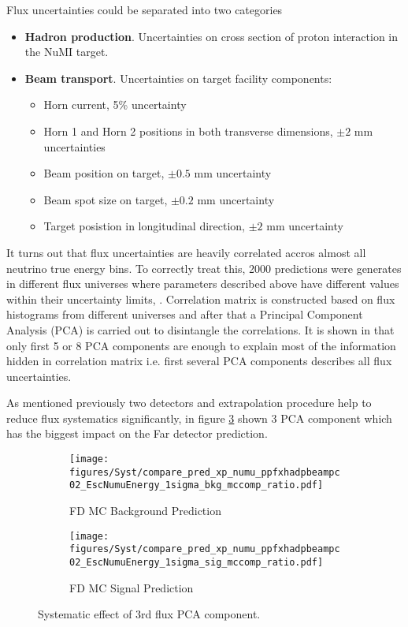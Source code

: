 Flux uncertainties could be separated into two categories 
\begin{itemize}
\item \textbf{Hadron production}. Uncertainties on cross section of proton interaction in the NuMI target. 
\item \textbf{Beam transport}. Uncertainties on target facility components:
\begin{itemize}
	\item Horn current, 5\% uncertainty
	\item Horn 1 and Horn 2 positions in both transverse dimensions,  $\pm2$ mm uncertainties
	\item Beam position on target, $\pm0.5$ mm uncertainty
        \item Beam spot size on target, $\pm0.2$ mm uncertainty
	\item Target posistion in longitudinal direction, $\pm2$ mm uncertainty
\end{itemize} 
\end{itemize}

It turns out that flux uncertainties are heavily correlated accros almost all neutrino true energy bins. To correctly treat this,
2000 predictions were generates in different flux universes where parameters described above have different values within their
uncertainty limits, \cite{fluxPCA_technote}. Correlation matrix is constructed based on flux histograms from different universes 
and after that a Principal Component Analysis (PCA) is carried out to disintangle the correlations. It is shown in 
\cite{fluxPCA_technote} that only first 5 or 8 PCA components are enough to explain most of the information hidden in correlation 
matrix i.e. first several PCA components describes all flux uncertainties. 

As mentioned previously two detectors and extrapolation procedure help to reduce flux systematics significantly, in figure 
\ref{fig:ppfxhadpbeampc02} shown 3 PCA component which has the biggest impact on the Far detector prediction.

\newpage
\begin{figure}[t!]
\begin{subfigure}[t]{0.5\textwidth}
  \centering
  \texttt{[image: figures/Syst/compare\_pred\_xp\_numu\_ppfxhadpbeampc02\_EscNumuEnergy\_1sigma\_bkg\_mccomp\_ratio.pdf]}
  \caption{FD MC Background Prediction}
  \label{fig:bkg_ppfxhadpbeampc02}
\end{subfigure}%
\begin{subfigure}[t]{0.5\textwidth}
  \centering
  \texttt{[image: figures/Syst/compare\_pred\_xp\_numu\_ppfxhadpbeampc02\_EscNumuEnergy\_1sigma\_sig\_mccomp\_ratio.pdf]}
  \caption{FD MC Signal Prediction}
  \label{fig:sig_ppfxhadpbeampc02}
\end{subfigure}
\caption{ Systematic effect of 3rd flux PCA component.}
\label{fig:ppfxhadpbeampc02}
\end{figure}

